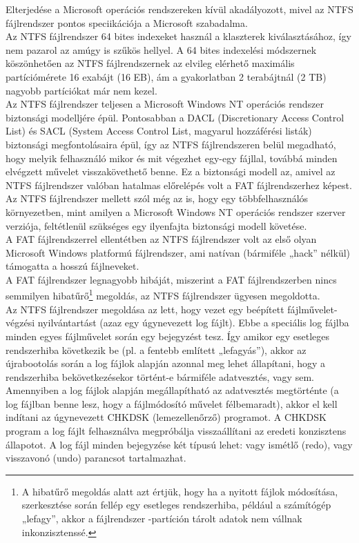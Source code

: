 \documentclass[tikz,12pt,margin=0px]{article}
\begin{document}
    \noindent Elterjedése a Microsoft operációs rendszereken kívül akadályozott, mivel az NTFS fájlrendszer pontos speciikációja a Microsoft szabadalma.\\

    \noindent Az NTFS fájlrendszer 64 bites indexeket használ a klaszterek kiválasztásához, így nem pazarol az amúgy is szűkös hellyel. A 64 bites indexelési módszernek köszönhetően az NTFS fájlrendszernek az elvileg elérhető maximális partíciómérete 16 exabájt (16 EB), ám a gyakorlatban 2 terabájtnál (2 TB) nagyobb partíciókat már nem kezel.\\

    \noindent Az NTFS fájlrendszer teljesen a Microsoft Windows NT operációs rendszer biztonsági modelljére épül. Pontosabban a DACL (Discretionary Access Control List) és SACL (System Access Control List, magyarul hozzáférési listák) biztonsági megfontolásaira épül, így az NTFS fájlrendszeren belül megadható, hogy melyik felhasználó mikor és mit végezhet egy-egy fájllal, továbbá minden elvégzett művelet visszakövethető benne. Ez a biztonsági modell az, amivel az NTFS fájlrendszer valóban hatalmas előrelépés volt a FAT fájlrendszerhez képest. Az NTFS fájlrendszer mellett szól még az is, hogy egy többfelhasználós környezetben, mint amilyen a Microsoft Windows NT operációs rendszer szerver verziója, feltétlenül szükséges egy ilyenfajta biztonsági modell követése.\\

    \noindent A FAT fájlrendszerrel ellentétben az NTFS fájlrendszer volt az első olyan Microsoft Windows platformú fájlrendszer, ami natívan (bármiféle „hack” nélkül) támogatta a hosszú fájlneveket.\\

    \noindent A FAT fájlrendszer legnagyobb hibáját, miszerint a FAT fájlrendszerben nincs semmilyen hibatűrő\footnote{A hibatűrő megoldás alatt azt értjük, hogy ha a nyitott fájlok módosítása, szerkesztése során fellép egy esetleges rendszerhiba, például a számítógép „lefagy”, akkor a fájlrendszer -partíción tárolt adatok nem vállnak inkonzisztenssé.} megoldás, az NTFS fájlrendszer ügyesen megoldotta.\\

    \noindent Az NTFS fájlrendszer megoldása az lett, hogy vezet egy beépített fájlművelet-végzési nyilvántartást (azaz egy úgynevezett log fájlt). Ebbe a speciális log fájlba minden egyes fájlművelet során egy bejegyzést tesz. Így amikor egy esetleges rendszerhiba következik be (pl. a fentebb említett „lefagyás”), akkor az újrabootolás során a log fájlok alapján azonnal meg lehet állapítani, hogy a rendszerhiba bekövetkezésekor történt-e bármiféle adatvesztés, vagy sem. Amennyiben a log fájlok alapján megállapítható az adatvesztés megtörténte (a log fájlban benne lesz, hogy a fájlmódosító művelet félbemaradt), akkor el kell indítani az úgynevezett CHKDSK (lemezellenőrző) programot. A CHKDSK program a log fájlt felhasználva megpróbálja visszaállítani az eredeti konzisztens állapotot. A log fájl minden bejegyzése két típusú lehet: vagy ismétlő (redo), vagy visszavonó (undo) parancsot tartalmazhat.\\
\end{document}

